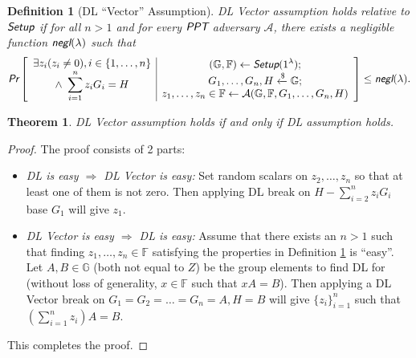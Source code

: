 \documentclass{article}
\newtheorem{definition}{Definition}[section]
\newtheorem{theorem}{Theorem}[section]
\begin{document}
\begin{definition}[DL ``Vector'' Assumption]\label{vector}
DL Vector assumption holds relative to $\emph{\textsf{Setup}}$ if for all $n>1$ and for every $\emph{\textsf{PPT}}$ adversary $\mathcal{A}$, there exists a negligible function $\emph{\textsf{negl}}(\lambda)$ such that
\begin{align*}
\emph{\textsf{Pr}}\left[
\begin{array}{c|c}
    \begin{gathered}
        \exists z_i(z_i \neq 0), i\in\{1, \ldots, n\} \\
        \wedge\ \sum_{i=1}^{n}{z_i G_i}=H
    \end{gathered}
    &
    \begin{gathered}
        (\mathbb{G}, \mathbb{F})\leftarrow\emph{\textsf{Setup}}(1^{\lambda}); \\
        G_1,\ldots, G_n, H\xleftarrow{\$}\mathbb{G}; \\
        z_1, \ldots, z_n\in\mathbb{F}\leftarrow\mathcal{A}(\mathbb{G}, \mathbb{F}, G_1, \ldots, G_n, H) \\
    \end{gathered}
\end{array}
\right]
\le \emph{\textsf{negl}}(\lambda).
\end{align*}
\end{definition}

\begin{theorem}
DL Vector assumption holds if and only if DL assumption holds.
\end{theorem}
\begin{proof}
The proof consists of 2 parts:
\begin{itemize}
    \item \textit{DL is easy $\Rightarrow$ DL Vector is easy:} Set random scalars on $z_2,\ldots,z_n$ so that at least one of them is not zero. Then applying DL break on $H - \sum_{i=2}^{n}{z_i G_i}$ base $G_1$ will give $z_1$.
    \item \textit{DL Vector is easy $\Rightarrow$ DL is easy:} Assume that there exists an $n>1$ such that finding $z_1,\ldots,z_n\in\mathbb{F}$ satisfying the properties in Definition \ref{vector} is ``easy''. Let $A, B\in\mathbb{G}$ (both not equal to $Z$) be the group elements to find DL for (without loss of generality, $x\in\mathbb{F}$ such that $xA=B$). Then applying a DL Vector break on $G_1=G_2=\ldots=G_n=A, H=B$ will give $\{z_i\}_{i=1}^n$ such that $(\sum_{i=1}^n{z_i}) A = B$.
\end{itemize}
This completes the proof.
\end{proof}

%
%
\end{document}
